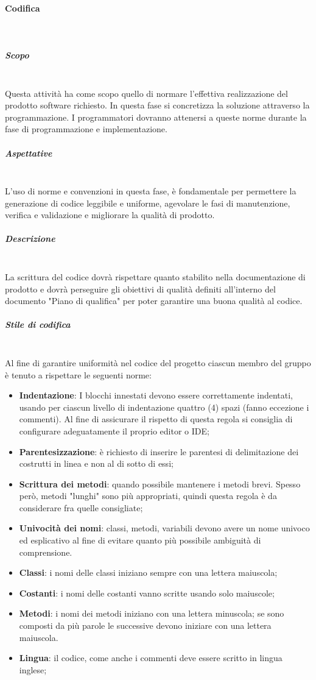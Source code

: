 \paragraph{Codifica} \mbox{}\\
\subparagraph{Scopo} \mbox{}\\
Questa attività ha come scopo quello di normare l'effettiva realizzazione del prodotto software richiesto. In questa fase si concretizza la soluzione attraverso la programmazione. I programmatori dovranno attenersi a queste norme durante la fase di programmazione e implementazione.
\subparagraph{Aspettative} \mbox{}\\
L'uso di norme e convenzioni in questa fase, è fondamentale per permettere la generazione di codice leggibile e uniforme,  agevolare le fasi di manutenzione,  verifica e validazione e migliorare la qualità di prodotto.
\subparagraph{Descrizione} \mbox{}\\
La scrittura del codice dovrà rispettare quanto stabilito nella documentazione di prodotto e dovrà perseguire gli obiettivi di qualità definiti all’interno del documento "Piano di qualifica" per poter garantire una buona qualità al codice.
\subparagraph{Stile di codifica} \mbox{}\\
Al fine di garantire uniformità nel codice del progetto ciascun membro del gruppo è
tenuto a rispettare le seguenti norme:
\begin{itemize}
	\item \textbf{Indentazione}: I blocchi innestati devono essere correttamente indentati, usando per ciascun livello di indentazione quattro (4) spazi (fanno eccezione i commenti). Al fine di assicurare il rispetto di questa regola si consiglia di configurare adeguatamente il proprio editor o IDE; %
	\item \textbf{Parentesizzazione}: è richiesto di inserire le parentesi di delimitazione dei costrutti in linea e non al di sotto di essi;
	\item \textbf{Scrittura dei metodi}: quando possibile mantenere i metodi brevi. Spesso però, metodi "lunghi" sono più appropriati, quindi questa regola è da considerare fra quelle consigliate;
	\item \textbf{Univocità dei nomi}: classi, metodi, variabili devono avere un nome univoco	ed esplicativo al fine di evitare quanto più possibile ambiguità di comprensione.
	\item \textbf{Classi}: i nomi delle classi iniziano sempre con una lettera maiuscola;
	\item \textbf{Costanti}: i nomi delle costanti vanno scritte usando solo maiuscole;
	\item \textbf{Metodi}: i nomi dei metodi iniziano con una lettera minuscola;
	se sono composti da più parole le successive devono iniziare con una lettera
	maiuscola.
	\item \textbf{Lingua}: il codice, come anche i commenti deve essere scritto in lingua inglese;
\end{itemize}
